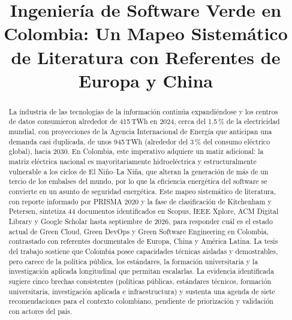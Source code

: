 \documentclass[conference]{IEEEtran}
\begin{document}
\title{Ingenier\'ia de Software Verde en Colombia: Un Mapeo Sistem\'atico de Literatura con Referentes de Europa y China}

\author{%
\and
{}
}

\maketitle

\begin{abstract}
La industria de las tecnolog\'ias de la informaci\'on contin\'ua expandi\'endose y los centros de datos consumieron alrededor de 415\,TWh en 2024, cerca del 1.5\,\% de la electricidad mundial, con proyecciones de la Agencia Internacional de Energ\'ia que anticipan una demanda casi duplicada, de unos 945\,TWh (alrededor del 3\,\% del consumo el\'ectrico global), hacia 2030. En Colombia, este imperativo adquiere un matiz adicional: la matriz el\'ectrica nacional es mayoritariamente hidroel\'ectrica y estructuralmente vulnerable a los ciclos de El Niño--La Niña, que alteran la generaci\'on de m\'as de un tercio de los embalses del mundo, por lo que la eficiencia energ\'etica del software se convierte en un asunto de seguridad energ\'etica. Este mapeo sistem\'atico de literatura, con reporte informado por PRISMA 2020 y la fase de clasificaci\'on de Kitchenham y Petersen, sintetiza 44 documentos identificados en Scopus, IEEE Xplore, ACM Digital Library y Google Scholar hasta septiembre de 2026, para responder cu\'al es el estado actual de Green Cloud, Green DevOps y Green Software Engineering en Colombia, contrastado con referentes documentales de Europa, China y Am\'erica Latina. La tesis del trabajo sostiene que Colombia posee capacidades t\'ecnicas aisladas y demostrables, pero carece de la pol\'itica p\'ublica, los est\'andares, la formaci\'on universitaria y la investigaci\'on aplicada longitudinal que permitan escalarlas. La evidencia identificada sugiere cinco brechas consistentes (pol\'iticas p\'ublicas, est\'andares t\'ecnicos, formaci\'on universitaria, investigaci\'on aplicada e infraestructura) y sustenta una agenda de siete recomendaciones para el contexto colombiano, pendiente de priorizaci\'on y validaci\'on con actores del pa\'is.
\end{abstract}
\end{document}
